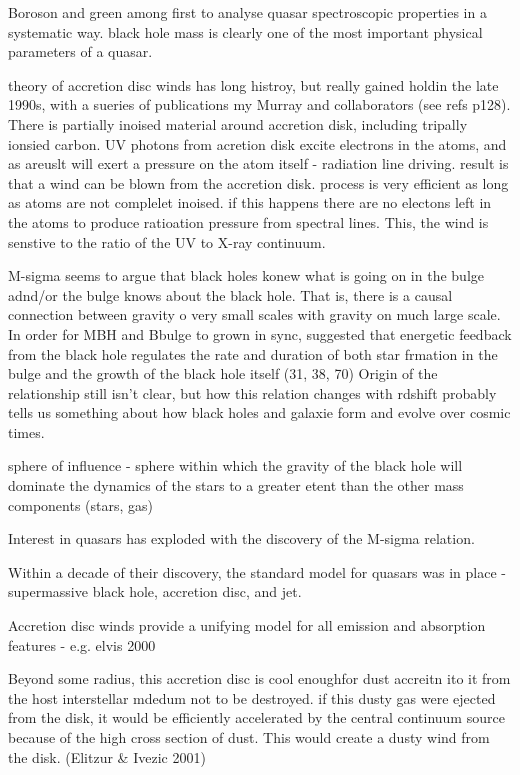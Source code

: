 Boroson and green among first to analyse quasar spectroscopic properties in a systematic way.
black hole mass is clearly one of the most important physical parameters of a quasar. 

theory of accretion disc winds has long histroy, but really gained holdin the late 1990s, with a sueries of publications my Murray and collaborators (see refs p128). There is partially inoised material around accretion disk, including tripally ionsied carbon. UV photons from acretion disk excite electrons in the atoms, and as areuslt will exert a pressure on the atom itself - radiation line driving.  result is that a wind can be blown from the accretion disk. process is very efficient as long as atoms are not complelet inoised. if this happens there are no electons left in the atoms to produce ratioation pressure from spectral lines. This, the wind is senstive to the ratio of the UV to X-ray continuum. 


M-sigma seems to argue that black holes konew what is going on in the bulge adnd/or the bulge knows about the black hole. 
That is, there is a causal connection between gravity o very small scales with gravity on much large scale. 
In order for MBH and Bbulge to grown in sync, suggested that energetic feedback from the black hole regulates the rate and duration of both star frmation in the bulge and the growth of the black hole itself (31, 38, 70)
Origin of the relationship still isn't clear, but how this relation changes with rdshift probably tells us something about how black holes and galaxie form and evolve over cosmic times. 

sphere of influence - sphere within which the gravity of the black hole will dominate the dynamics of the stars to a greater etent than the other mass components (stars, gas)

Interest in quasars has exploded with the discovery of the M-sigma relation. 

Within a decade of their discovery, the standard model for quasars was in place  - supermassive black hole, accretion disc, and jet. 

Accretion disc winds provide a unifying model for all emission and absorption features - e.g. elvis 2000

Beyond some radius, this accretion disc is cool enoughfor dust accreitn ito it from the host interstellar mdedum not to be destroyed. if this dusty gas were ejected from the disk, it would be efficiently accelerated by the central continuum source because of the high cross section of dust. This would create a dusty wind from the disk. 
(Elitzur \& Ivezic 2001)

